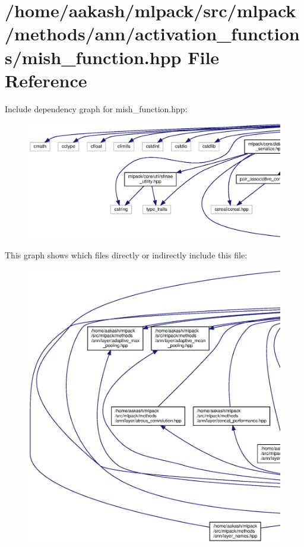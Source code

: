 \section{/home/aakash/mlpack/src/mlpack/methods/ann/activation\+\_\+functions/mish\+\_\+function.hpp File Reference}
\label{mish__function_8hpp}
Include dependency graph for mish\+\_\+function.\+hpp\+:
\nopagebreak
\begin{figure}[H]
\begin{center}
\leavevmode
\includegraphics[width=350pt]{mish__function_8hpp__incl}
\end{center}
\end{figure}
This graph shows which files directly or indirectly include this file\+:
\nopagebreak
\begin{figure}[H]
\begin{center}
\leavevmode
\includegraphics[width=350pt]{mish__function_8hpp__dep__incl}
\end{center}
\end{figure}
